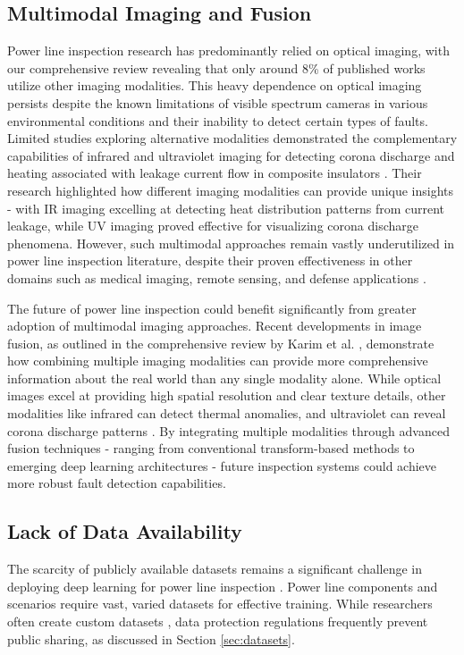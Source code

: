 \subsection{Multimodal Imaging and Fusion}
Power line inspection research has predominantly relied on optical imaging, with our comprehensive review revealing that only around 8\% of published works utilize other imaging modalities. This heavy dependence on optical imaging persists despite the known limitations of visible spectrum cameras in various environmental conditions and their inability to detect certain types of faults. Limited studies exploring alternative modalities demonstrated the complementary capabilities of infrared and ultraviolet imaging for detecting corona discharge and heating associated with leakage current flow in composite insulators \cite{singh_design_2021, liu_discrimination_2017, li_image_2019}. Their research highlighted how different imaging modalities can provide unique insights - with IR imaging excelling at detecting heat distribution patterns from current leakage, while UV imaging proved effective for visualizing corona discharge phenomena. However, such multimodal approaches remain vastly underutilized in power line inspection literature, despite their proven effectiveness in other domains such as medical imaging, remote sensing, and defense applications \cite{karim2023current, meher2019survey}.

The future of power line inspection could benefit significantly from greater adoption of multimodal imaging approaches. Recent developments in image fusion, as outlined in the comprehensive review by Karim et al. \cite{karim2023current}, demonstrate how combining multiple imaging modalities can provide more comprehensive information about the real world than any single modality alone. While optical images excel at providing high spatial resolution and clear texture details, other modalities like infrared can detect thermal anomalies, and ultraviolet can reveal corona discharge patterns \cite{shen2017research}. By integrating multiple modalities through advanced fusion techniques - ranging from conventional transform-based methods to emerging deep learning architectures \cite{ma2019fusiongan, han2020electrical} - future inspection systems could achieve more robust fault detection capabilities. 

\subsection{Lack of Data Availability}
The scarcity of publicly available datasets remains a significant challenge in deploying deep learning for power line inspection \cite{song2020analysis}. Power line components and scenarios require vast, varied datasets for effective training. While researchers often create custom datasets \cite{chen_research_2019}, data protection regulations frequently prevent public sharing, as discussed in Section \ref{sec:datasets}.

